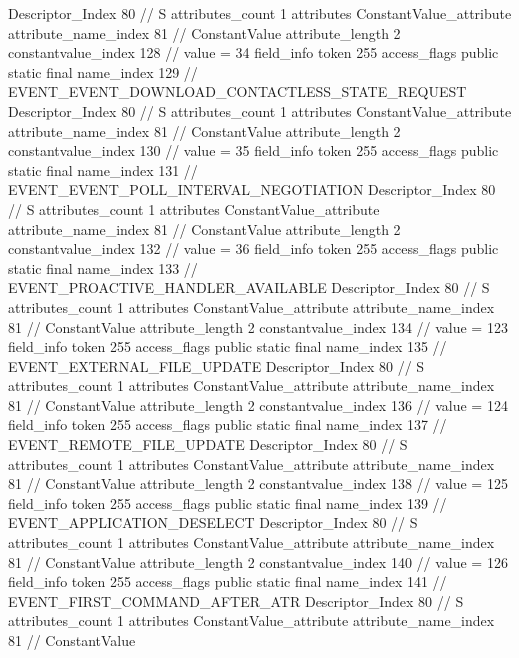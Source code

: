 {{{{{				Descriptor_Index	80		// S
				attributes_count	1
				attributes {
				ConstantValue_attribute {
					attribute_name_index	81		// ConstantValue
					attribute_length	2
					constantvalue_index	128		// value = 34
				}
				}
			}
			field_info {
				token	255
				access_flags	public static final
				name_index	129		// EVENT_EVENT_DOWNLOAD_CONTACTLESS_STATE_REQUEST
				Descriptor_Index	80		// S
				attributes_count	1
				attributes {
				ConstantValue_attribute {
					attribute_name_index	81		// ConstantValue
					attribute_length	2
					constantvalue_index	130		// value = 35
				}
				}
			}
			field_info {
				token	255
				access_flags	public static final
				name_index	131		// EVENT_EVENT_POLL_INTERVAL_NEGOTIATION
				Descriptor_Index	80		// S
				attributes_count	1
				attributes {
				ConstantValue_attribute {
					attribute_name_index	81		// ConstantValue
					attribute_length	2
					constantvalue_index	132		// value = 36
				}
				}
			}
			field_info {
				token	255
				access_flags	public static final
				name_index	133		// EVENT_PROACTIVE_HANDLER_AVAILABLE
				Descriptor_Index	80		// S
				attributes_count	1
				attributes {
				ConstantValue_attribute {
					attribute_name_index	81		// ConstantValue
					attribute_length	2
					constantvalue_index	134		// value = 123
				}
				}
			}
			field_info {
				token	255
				access_flags	public static final
				name_index	135		// EVENT_EXTERNAL_FILE_UPDATE
				Descriptor_Index	80		// S
				attributes_count	1
				attributes {
				ConstantValue_attribute {
					attribute_name_index	81		// ConstantValue
					attribute_length	2
					constantvalue_index	136		// value = 124
				}
				}
			}
			field_info {
				token	255
				access_flags	public static final
				name_index	137		// EVENT_REMOTE_FILE_UPDATE
				Descriptor_Index	80		// S
				attributes_count	1
				attributes {
				ConstantValue_attribute {
					attribute_name_index	81		// ConstantValue
					attribute_length	2
					constantvalue_index	138		// value = 125
				}
				}
			}
			field_info {
				token	255
				access_flags	public static final
				name_index	139		// EVENT_APPLICATION_DESELECT
				Descriptor_Index	80		// S
				attributes_count	1
				attributes {
				ConstantValue_attribute {
					attribute_name_index	81		// ConstantValue
					attribute_length	2
					constantvalue_index	140		// value = 126
				}
				}
			}
			field_info {
				token	255
				access_flags	public static final
				name_index	141		// EVENT_FIRST_COMMAND_AFTER_ATR
				Descriptor_Index	80		// S
				attributes_count	1
				attributes {
				ConstantValue_attribute {
					attribute_name_index	81		// ConstantValue
}}}}}}}
